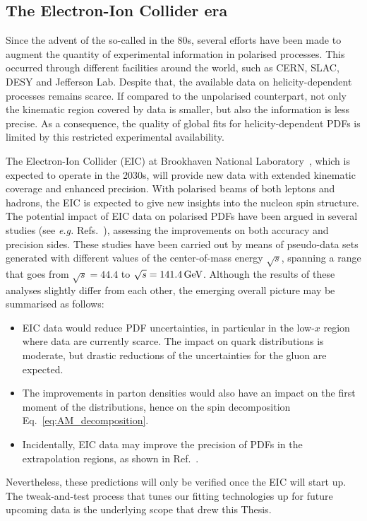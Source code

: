 \subsection*{The Electron-Ion Collider era}

Since the advent of the so-called  in the 80s, several efforts have been made to augment the quantity of experimental information in polarised processes. This occurred through different facilities around the world, such as CERN, SLAC, DESY and Jefferson Lab. Despite that, the available data on helicity-dependent processes remains scarce. If compared to the unpolarised counterpart, not only the kinematic region covered by data is smaller, but also the information is less precise. As a consequence, the quality of global fits for helicity-dependent PDFs is limited by this restricted experimental availability. 

The Electron-Ion Collider (EIC) at Brookhaven National Laboratory~\cite{AbdulKhalek:2021gbh}, which is expected to operate in the 2030s, will provide new data with extended kinematic coverage and enhanced precision. With polarised beams of both leptons and hadrons, the EIC is expected to give new insights into the nucleon spin structure. The potential impact of EIC data on polarised PDFs have been argued in several studies (see \textit{e.g.} Refs.~\cite{Borsa:2020lsz, Aschenauer:2012ve, Ball:2013tyh, Aschenauer:2015ata}), assessing the improvements on both accuracy and precision sides. These studies have been carried out by means of pseudo-data sets generated with different values of the center-of-mass energy $\sqrt{s}$, spanning a range that goes from $\sqrt{s} = 44.4$ to $\sqrt{s} = 141.4 \,\textrm{GeV}$. Although the results of these analyses slightly differ from each other, the emerging overall picture may be summarised as follows:
%
\begin{itemize}
  \item EIC data would reduce PDF uncertainties, in particular in the low-$x$ region where data are currently scarce. The impact on quark distributions is moderate, but drastic reductions of the uncertainties for the gluon are expected.
  \item The improvements in parton densities would also have an impact on the first moment of the distributions, hence on the spin decomposition Eq.~\eqref{eq:AM_decomposition}.
  \item Incidentally, EIC data may improve the precision of PDFs in the extrapolation regions, as shown in Ref.~\cite{Ball:2013tyh}.
\end{itemize}
%
Nevertheless, these predictions will only be verified once the EIC will start up. The tweak-and-test process that tunes our fitting technologies up for future upcoming data is the underlying scope that drew this Thesis.

